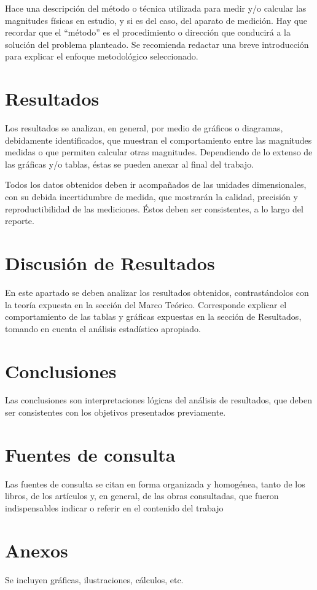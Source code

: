 \documentclass[10pt,journal]{IEEEtran}
\begin{document}
Hace una descripción del método o técnica utilizada para medir y/o calcular las
magnitudes físicas en estudio, y si es del caso, del aparato de medición. Hay que
recordar que el “método” es el procedimiento o dirección que conducirá a la solución
del problema planteado. Se recomienda redactar una breve introducción para explicar
el enfoque metodológico seleccionado.

\section{Resultados}

Los resultados se analizan, en general, por medio de gráficos o diagramas,
debidamente identificados, que muestran el comportamiento entre las magnitudes
medidas o que permiten calcular otras magnitudes. Dependiendo de lo extenso de las
gráficas y/o tablas, éstas se pueden anexar al final del trabajo.

Todos los datos obtenidos deben ir acompañados de las unidades dimensionales,
con su debida incertidumbre de medida, que mostrarán la calidad, precisión y
reproductibilidad de las mediciones. Éstos deben ser consistentes, a lo largo del
reporte.

\section{Discusión de Resultados}

En este apartado se deben analizar los resultados obtenidos, contrastándolos con
la teoría expuesta en la sección del Marco Teórico. Corresponde explicar el
comportamiento de las tablas y gráficas expuestas en la sección de Resultados,
tomando en cuenta el análisis estadístico apropiado.

\section{Conclusiones}

Las conclusiones son interpretaciones lógicas del análisis de resultados, que
deben ser consistentes con los objetivos presentados previamente.

\section{Fuentes de consulta}

Las fuentes de consulta se citan en forma organizada y homogénea, tanto de los
libros, de los artículos y, en general, de las obras consultadas, que fueron
indispensables indicar o referir en el contenido del trabajo

\section{Anexos}

Se incluyen gráficas, ilustraciones, cálculos, etc.
\end{document}
